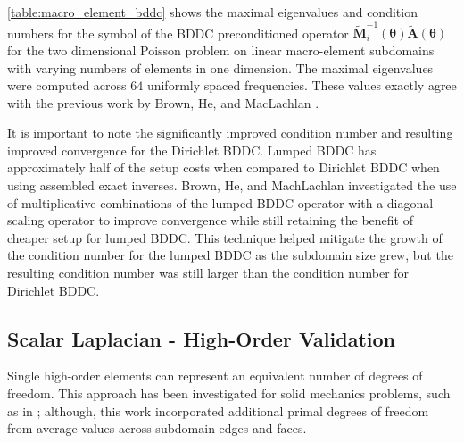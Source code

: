 \documentclass[review]{siamart190516}
\begin{document}
\cref{table:macro_element_bddc} shows the maximal eigenvalues and condition numbers for the symbol of the BDDC preconditioned operator $\tilde{\mathbf{M}}^{-1}_i \left( \boldsymbol{\theta} \right) \tilde{\mathbf{A}} \left( \boldsymbol{\theta} \right)$ for the two dimensional Poisson problem on linear macro-element subdomains with varying numbers of elements in one dimension.
The maximal eigenvalues were computed across $64$ uniformly spaced frequencies.
These values exactly agree with the previous work by Brown, He, and MacLachlan \cite{brown2019local}.

It is important to note the significantly improved condition number and resulting improved convergence for the Dirichlet BDDC.
Lumped BDDC has approximately half of the setup costs when compared to Dirichlet BDDC when using assembled exact inverses.
Brown, He, and MachLachlan investigated the use of multiplicative combinations of the lumped BDDC operator with a diagonal scaling operator to improve convergence while still retaining the benefit of cheaper setup for lumped BDDC.
This technique helped mitigate the growth of the condition number for the lumped BDDC as the subdomain size grew, but the resulting condition number was still larger than the condition number for Dirichlet BDDC.

\subsection{Scalar Laplacian - High-Order Validation}\label{sec:highordervalidate}

Single high-order elements can represent an equivalent number of degrees of freedom.
This approach has been investigated for solid mechanics problems, such as in \cite{pavarino2010bddc}; although, this work incorporated additional primal degrees of freedom from average values across subdomain edges and faces.
\end{document}
